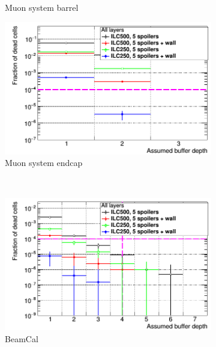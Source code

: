 \begin{figure}[htb]
\begin{subfigure}[b]{0.49\textwidth}
   \caption{\sid Muon system barrel}
   \end{subfigure}
   \hfill
    \begin{subfigure}[b]{0.49\textwidth}
   \centering
    \includegraphics[width=\textwidth]{Figures/BDS_muons/Occupancy_Comparison_All_layers_deadcells_MuonEndcap.png}
   \caption{\sid Muon system endcap}
   \end{subfigure}\\
     \begin{subfigure}[b]{0.49\textwidth}
   \centering
    \includegraphics[width=\textwidth]{Figures/BDS_muons/Occupancy_Comparison_All_layers_deadcells_BeamCal.png}
   \caption{\sid BeamCal}
   \end{subfigure}
   \hfill
    \begin{subfigure}[b]{0.49\textwidth}
   \centering

\end{subfigure}
\end{figure}
